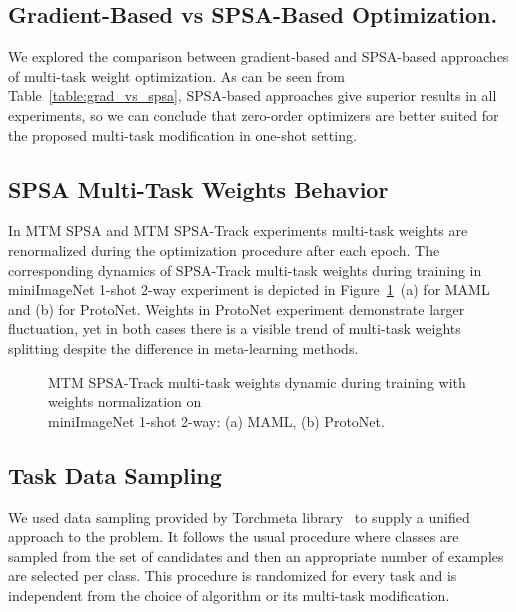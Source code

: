 \documentclass{article}
\begin{document}
\subsection{Gradient-Based vs SPSA-Based Optimization.} 

We explored the comparison between gradient-based and SPSA-based approaches of multi-task weight optimization. As can be seen from Table~\ref{table:grad_vs_spsa}, SPSA-based approaches give superior results in all experiments, so we can conclude that zero-order optimizers are better suited for the proposed multi-task modification in one-shot setting.

\subsection{SPSA Multi-Task Weights Behavior}

In MTM SPSA and MTM SPSA-Track experiments multi-task weights are renormalized during the optimization procedure after each epoch. The corresponding dynamics of SPSA-Track multi-task weights during training in miniImageNet 1-shot 2-way experiment is depicted in Figure~\ref{fig:weight-normalization-weights}~(a) for MAML and (b) for ProtoNet. Weights in ProtoNet experiment demonstrate larger fluctuation, yet in both cases there is a visible trend of multi-task weights splitting despite the difference in meta-learning methods.

\begin{figure}[ht]
    \centering
    \caption{MTM SPSA-Track multi-task weights dynamic during training with weights normalization on\\ miniImageNet 1-shot 2-way: (a) MAML, (b) ProtoNet.}
    \label{fig:weight-normalization-weights}
\end{figure}

\subsection{Task Data Sampling}

We used data sampling provided by Torchmeta library~\citep{DBLP:journals/corr/abs-1909-06576} to supply a unified approach to the problem. It follows the usual procedure where classes are sampled from the set of candidates and then an appropriate number of examples are selected per class. This procedure is randomized for every task and is independent from the choice of algorithm or its multi-task modification.
\end{document}
